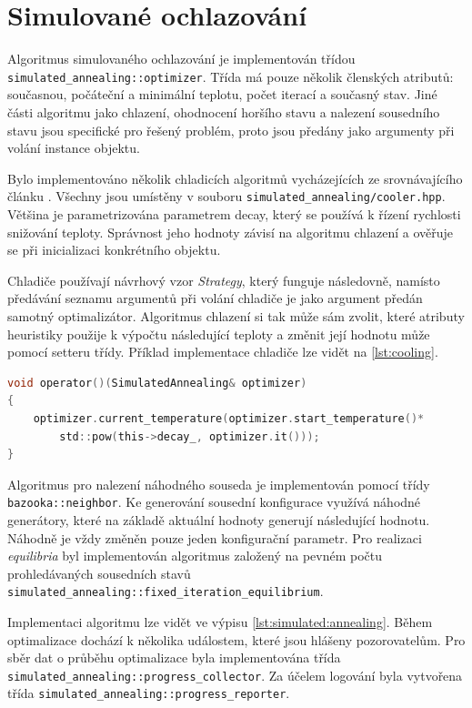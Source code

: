\section{Simulované ochlazování}
Algoritmus simulovaného ochlazování je implementován třídou \texttt{simulated\_annealing::optimizer}.
Třída má pouze několik členských atributů: současnou, počáteční a minimální teplotu, počet iterací a současný stav.
Jiné části algoritmu jako chlazení, ohodnocení horšího stavu a nalezení sousedního stavu jsou specifické pro řešený problém, proto jsou předány jako argumenty při volání instance objektu.

Bylo implementováno několik chladicích algoritmů vycházejících ze srovnávajícího článku \cite{cooling-comparison}.
Všechny jsou umístěny v souboru \texttt{simulated\_annealing/cooler.hpp}.
Většina je parametrizována parametrem decay, který se používá k řízení rychlosti snižování teploty.
Správnost jeho hodnoty závisí na algoritmu chlazení a ověřuje se při inicializaci konkrétního objektu.

Chladiče používají návrhový vzor \textit{Strategy}, který funguje následovně, namísto předávání seznamu argumentů při volání chladiče je jako argument předán samotný optimalizátor.
Algoritmus chlazení si tak může sám zvolit, které atributy heuristiky použije k výpočtu následující teploty a změnit její hodnotu může pomocí setteru třídy.
Příklad implementace chladiče lze vidět na \ref{lst:cooling}.

\begin{lstlisting}[caption={~Ukázka implementace chlazení třídy \texttt{simulated\_annealing::exp\_mul\_cooler }},label={lst:cooling},captionpos=t,abovecaptionskip=-\medskipamount,belowcaptionskip=\medskipamount,language=C]
void operator()(SimulatedAnnealing& optimizer)
{
    optimizer.current_temperature(optimizer.start_temperature()*
        std::pow(this->decay_, optimizer.it()));
}
\end{lstlisting}

Algoritmus pro nalezení náhodného souseda je implementován pomocí třídy \texttt{bazooka::neighbor}.
Ke generování sousední konfigurace využívá náhodné generátory, které na základě aktuální hodnoty generují následující hodnotu.
Náhodně je vždy změněn pouze jeden konfigurační parametr.
Pro realizaci \textit{equilibria} byl implementován algoritmus založený na pevném počtu prohledávaných sousedních stavů \texttt{simulated\_annealing::fixed\_iteration\_equilibrium}.

Implementaci algoritmu lze vidět ve výpisu \ref{lst:simulated:annealing}.
Během optimalizace dochází k několika událostem, které jsou hlášeny pozorovatelům.
Pro sběr dat o průběhu optimalizace byla implementována třída \texttt{simulated\_annealing::progress\_collector}.
Za účelem logování byla vytvořena třída \texttt{simulated\_annealing::progress\_reporter}.

